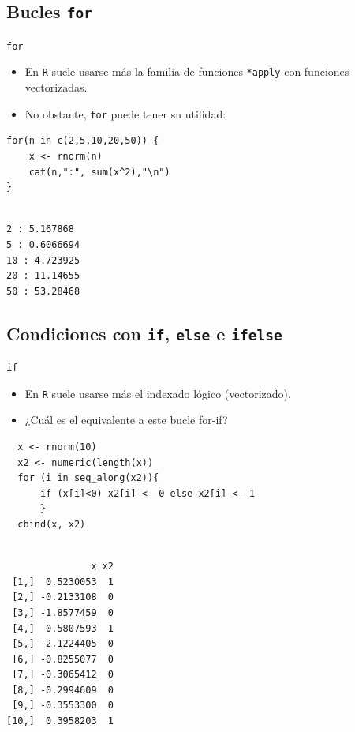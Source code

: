 \documentclass[aspectratio=169, usenames,svgnames,dvipsnames]{beamer}
\begin{document}
\subsection{Bucles \texttt{for}}
\label{sec:orgeca4082}
\begin{frame}[label={sec:orgaa49e48},fragile]{\texttt{for}}
 \begin{itemize}
\item En \texttt{R} suele usarse más la familia de funciones \texttt{*apply} con funciones vectorizadas.
\item No obstante, \texttt{for} puede tener su utilidad:
\end{itemize}
\lstset{language=r,label= ,caption= ,captionpos=b,numbers=none}
\begin{lstlisting}
for(n in c(2,5,10,20,50)) {
    x <- rnorm(n)
    cat(n,":", sum(x^2),"\n")
}
\end{lstlisting}

\begin{verbatim}

2 : 5.167868 
5 : 0.6066694 
10 : 4.723925 
20 : 11.14655 
50 : 53.28468
\end{verbatim}
\end{frame}

\subsection{Condiciones con \texttt{if}, \texttt{else} e \texttt{ifelse}}
\label{sec:org8a65287}
\begin{frame}[label={sec:org9ca47af},fragile]{\texttt{if}}
 \begin{itemize}
\item En \texttt{R} suele usarse más el indexado lógico (vectorizado).
\item ¿Cuál es el equivalente a este bucle for-if?
\end{itemize}
\lstset{language=r,label= ,caption= ,captionpos=b,numbers=none}
\begin{lstlisting}
  x <- rnorm(10)
  x2 <- numeric(length(x))
  for (i in seq_along(x2)){
      if (x[i]<0) x2[i] <- 0 else x2[i] <- 1
      }
  cbind(x, x2)
\end{lstlisting}

\begin{verbatim}

               x x2
 [1,]  0.5230053  1
 [2,] -0.2133108  0
 [3,] -1.8577459  0
 [4,]  0.5807593  1
 [5,] -2.1224405  0
 [6,] -0.8255077  0
 [7,] -0.3065412  0
 [8,] -0.2994609  0
 [9,] -0.3553300  0
[10,]  0.3958203  1
\end{verbatim}
\end{frame}
\end{document}
